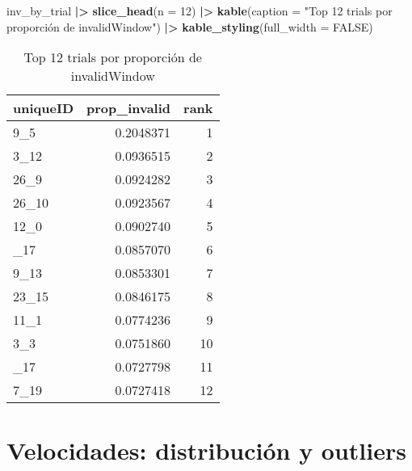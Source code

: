 \documentclass[
]{article}
\newenvironment{Shaded}{\begin{snugshade}}{\end{snugshade}}
\newcommand{\AttributeTok}[1]{\textcolor[rgb]{0.13,0.29,0.53}{#1}}
\newcommand{\ConstantTok}[1]{\textcolor[rgb]{0.56,0.35,0.01}{#1}}
\newcommand{\DecValTok}[1]{\textcolor[rgb]{0.00,0.00,0.81}{#1}}
\newcommand{\FunctionTok}[1]{\textcolor[rgb]{0.13,0.29,0.53}{\textbf{#1}}}
\newcommand{\NormalTok}[1]{#1}
\newcommand{\SpecialCharTok}[1]{\textcolor[rgb]{0.81,0.36,0.00}{\textbf{#1}}}
\newcommand{\StringTok}[1]{\textcolor[rgb]{0.31,0.60,0.02}{#1}}
\begin{document}
\begin{Shaded}
\begin{Highlighting}[]
\NormalTok{inv\_by\_trial }\SpecialCharTok{|\textgreater{}}
  \FunctionTok{slice\_head}\NormalTok{(}\AttributeTok{n =} \DecValTok{12}\NormalTok{) }\SpecialCharTok{|\textgreater{}}
  \FunctionTok{kable}\NormalTok{(}\AttributeTok{caption =} \StringTok{"Top 12 trials por proporción de invalidWindow"}\NormalTok{) }\SpecialCharTok{|\textgreater{}}
  \FunctionTok{kable\_styling}\NormalTok{(}\AttributeTok{full\_width =} \ConstantTok{FALSE}\NormalTok{)}
\end{Highlighting}
\end{Shaded}

\begin{longtable}[t]{lrr}
\caption{\label{tab:unnamed-chunk-6}Top 12 trials por proporción de invalidWindow}\\
\toprule
uniqueID & prop\_invalid & rank\\
\midrule
9\_5 & 0.2048371 & 1\\
3\_12 & 0.0936515 & 2\\
26\_9 & 0.0924282 & 3\\
26\_10 & 0.0923567 & 4\\
12\_0 & 0.0902740 & 5\\
\addlinespace
23\_17 & 0.0857070 & 6\\
9\_13 & 0.0853301 & 7\\
23\_15 & 0.0846175 & 8\\
11\_1 & 0.0774236 & 9\\
3\_3 & 0.0751860 & 10\\
\addlinespace
29\_17 & 0.0727798 & 11\\
7\_19 & 0.0727418 & 12\\
\bottomrule
\end{longtable}

\section{Velocidades: distribución y
outliers}\label{velocidades-distribuciuxf3n-y-outliers}
\end{document}
